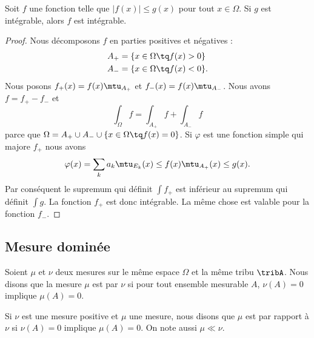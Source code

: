 \begin{lemma}   \label{LemPfHgal}
    Soit \( f\) une fonction telle que \( | f(x)|\leq g(x) \) pour tout \( x\in\Omega\). Si \( g\) est intégrable, alors \( f\) est intégrable.
\end{lemma}

\begin{proof}
    Nous décomposons \( f\) en parties positives et négatives :
    \begin{subequations}
        \begin{align}
            A_+&=\{ x\in\Omega\tq f(x)>0 \}\\
            A_-&=\{ x\in\Omega\tq f(x)<0 \}.
        \end{align}
    \end{subequations}
    Nous posons \( f_+(x)=f(x)\mtu_{A_+}\) et \( f_-(x)=f(x)\mtu_{A_-}\). Nous avons \( f=f_+-f_-\) et
    \begin{equation}
        \int_{\Omega}f=\int_{A_+}f+\int_{A_-}f
    \end{equation}
    parce que \( \Omega=A_+\cup A_-\cup\{ x\in\Omega\tq f(x)=0 \}\). Si \( \varphi\) est une fonction simple qui majore \( f_+\) nous avons
    \begin{equation}
        \varphi(x)=\sum_{k}a_k\mtu_{E_k}(x)\leq f(x)\mtu_{A_+}(x)\leq g(x).
    \end{equation}
    Par conséquent le supremum qui définit \( \int f_+\) est inférieur au supremum qui définit \( \int g\). La fonction \( f_+\) est donc intégrable. La même chose est valable pour la fonction \( f_-\).
\end{proof}

\subsection{Mesure dominée}

\begin{definition}
    Soient \( \mu\) et \( \nu\) deux mesures sur le même espace \( \Omega\) et la même tribu \( \tribA\). Nous disons que la mesure \( \mu\) est  par \( \nu\) si pour tout ensemble mesurable \( A\), \( \nu(A)=0\) implique \( \mu(A)=0\).

    Si \( \nu\) est une mesure positive et \( \mu\) une mesure, nous disons que \( \mu\) est  par rapport à \( \nu\) si \( \nu(A)=0\) implique \( \mu(A)=0\). On note aussi \( \mu\ll\nu\).
\end{definition}

